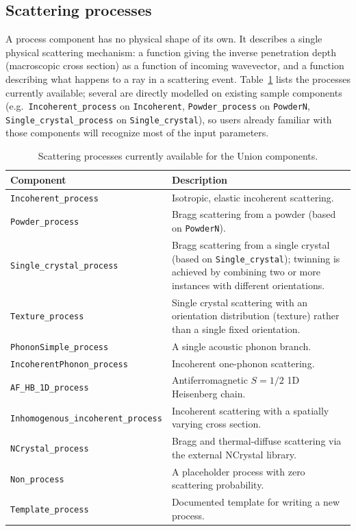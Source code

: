 \subsection{Scattering processes}
\label{sec:union-processes}

A process component has no physical shape of its own. It describes a single
physical scattering mechanism: a function giving the inverse penetration
depth (macroscopic cross section) as a function of incoming wavevector, and
a function describing what happens to a ray in a scattering event.
Table~\ref{t:union-processes} lists the processes currently available;
several are directly modelled on existing \MCS sample components (e.g.\
\texttt{Incoherent\_process} on \texttt{Incoherent}, \texttt{Powder\_process}
on \texttt{PowderN}, \texttt{Single\_crystal\_process} on
\texttt{Single\_crystal}), so users already familiar with those components
will recognize most of the input parameters.

\begin{table}[htb!]
  \begin{center}
    {\let\my=\\
    \begin{tabular}{|l|p{}|}
      \hline
      \textbf{Component} & \textbf{Description} \\
      \hline
      \texttt{Incoherent\_process} & Isotropic, elastic incoherent scattering. \\
      \texttt{Powder\_process} & Bragg scattering from a powder (based on \texttt{PowderN}). \\
      \texttt{Single\_crystal\_process} & Bragg scattering from a single crystal (based on \texttt{Single\_crystal}); twinning is achieved by combining two or more instances with different orientations. \\
      \texttt{Texture\_process} & Single crystal scattering with an orientation distribution (texture) rather than a single fixed orientation. \\
      \texttt{PhononSimple\_process} & A single acoustic phonon branch. \\
      \texttt{IncoherentPhonon\_process} & Incoherent one-phonon scattering. \\
      \texttt{AF\_HB\_1D\_process} & Antiferromagnetic $S=1/2$ 1D Heisenberg chain. \\
      \texttt{Inhomogenous\_incoherent\_process} & Incoherent scattering with a spatially varying cross section. \\
      \texttt{NCrystal\_process} & Bragg and thermal-diffuse scattering via the external NCrystal library. \\
      \texttt{Non\_process} & A placeholder process with zero scattering probability. \\
      \texttt{Template\_process} & Documented template for writing a new process. \\
      \hline
    \end{tabular}
    \caption{Scattering processes currently available for the Union components.}
    \label{t:union-processes}
    }
  \end{center}
\end{table}

